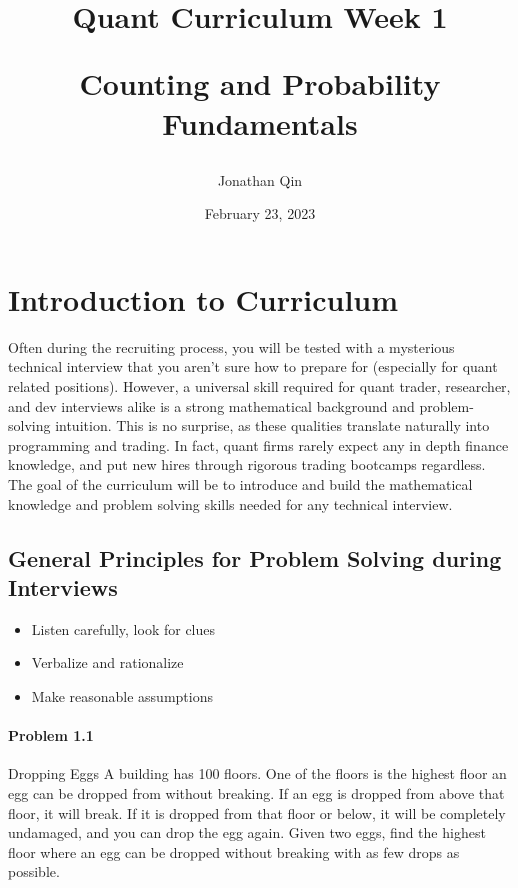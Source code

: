 \documentclass{article}
\title{

\begin{center} \textbf{Quant Curriculum Week 1}

Counting and Probability Fundamentals \end{center}
}
\author{Jonathan Qin}
\date{February 23, 2023}
\begin{document}
\maketitle

\section{Introduction to Curriculum}

Often during the recruiting process, you will be tested with a mysterious technical interview that you aren't sure how to prepare for (especially for quant related positions). However, a universal skill required for quant trader, researcher, and dev interviews alike is a strong mathematical background and problem-solving intuition. This is no surprise, as these qualities translate naturally into programming and trading. In fact, quant firms rarely expect any in depth finance knowledge, and put new hires through rigorous trading bootcamps regardless. The goal of the curriculum will be to introduce and build the mathematical knowledge and problem solving skills needed for any technical interview. 

\subsection{General Principles for Problem Solving during Interviews}
\begin{itemize}
    \item Listen carefully, look for clues 
    \item Verbalize and rationalize 
    \item Make reasonable assumptions
\end{itemize}

\paragraph{Problem 1.1} Dropping Eggs
\newline
\newline
A building has 100 floors. One of the floors is the highest floor an egg can be dropped from without breaking.
If an egg is dropped from above that floor, it will break. If it is dropped from that floor or below, it will be completely undamaged, and you can drop the egg again. Given two eggs, find the highest floor where an egg can be dropped without breaking with as few drops as possible. 
\newline
\end{document}
